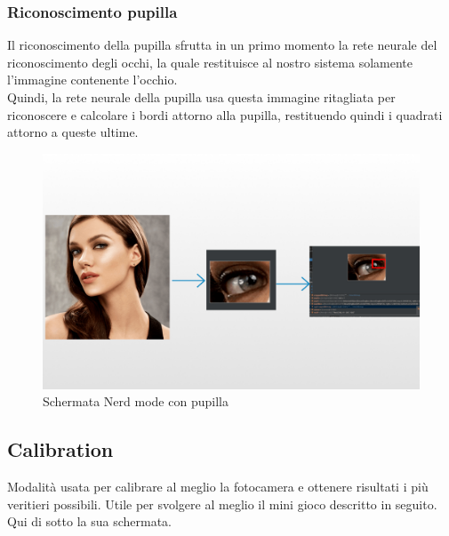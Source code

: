 \documentclass[11pt]{article}
\begin{document}
\subsubsection{Riconoscimento pupilla}
Il riconoscimento della pupilla sfrutta in un primo momento la rete neurale del riconoscimento degli occhi, la quale restituisce al nostro sistema solamente l'immagine contenente l'occhio.\\ Quindi, la rete neurale della pupilla usa questa immagine ritagliata per riconoscere e calcolare i bordi attorno alla pupilla, restituendo quindi i quadrati attorno a queste ultime.
\begin{figure}[h]
\caption{Schermata Nerd mode con pupilla }
\centering
\includegraphics[scale=0.25]{img/gazeAndroid.png}
\end{figure}


\subsection{Calibration}
Modalità usata per calibrare al meglio la fotocamera e ottenere risultati i più veritieri possibili. Utile per svolgere al meglio il mini gioco descritto in seguito. Qui di sotto la sua schermata.
\end{document}
